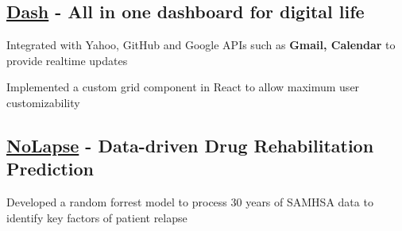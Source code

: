 

\subsection{\href{https://devpost.com/software/dash-um2zil}{Dash} - All in one dashboard for digital life}
\begin{zitemize}
    \item Integrated with Yahoo, GitHub and Google APIs such as \textbf{Gmail, Calendar} to provide realtime updates
    \item Implemented a custom grid component in React to allow maximum user customizability
\end{zitemize}



\vspace{0.3cm}\subsection{\href{https://devfolio.co/projects/nolapse-42de}{NoLapse} - Data-driven Drug Rehabilitation Prediction}
\begin{zitemize}
    \item Developed a random forrest model to process 30 years of SAMHSA data to identify key factors of patient relapse
\end{zitemize}